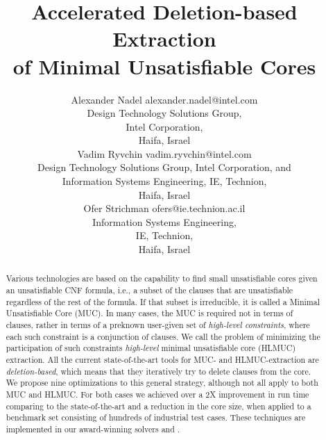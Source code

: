 \documentclass[twoside,11pt]{article}
\newcommand\haifamuc{\tool{HaifaMUC}\xspace}
\newcommand\haifahlmuc{\tool{HaifaHLMUC}\xspace}
\begin{document}


\newcommand\full[1]{}
\newcommand\short[1]{#1}
\title{Accelerated Deletion-based Extraction\\of Minimal Unsatisfiable Cores}
\author{\name Alexander Nadel
\email alexander.nadel@intel.com \\
\addr Design Technology Solutions Group, \\
Intel Corporation, \\
Haifa, Israel \\
%
\name Vadim Ryvchin
\email vadim.ryvchin@intel.com \\
\addr Design Technology Solutions Group, Intel Corporation, and\\
Information Systems Engineering, IE, Technion,\\
Haifa, Israel \\
%
\name Ofer Strichman
\email ofers@ie.technion.ac.il \\
\addr Information Systems Engineering, \\
IE, Technion, \\
Haifa, Israel \\
}

\maketitle

\begin{abstract}
Various technologies are based on the capability to find small unsatisfiable cores given an unsatisfiable CNF formula, i.e., a subset of the clauses that are unsatisfiable regardless of the rest of the formula.
If that subset is irreducible, it is called a Minimal Unsatisfiable Core (MUC).
In many cases, the MUC is required not in terms of clauses, rather in terms of a preknown user-given set of \emph{high-level constraints}, where each such constraint is a conjunction of clauses.
We call the problem of minimizing the participation of such
constraints \emph{high-level} minimal unsatisfiable
core (HLMUC) extraction. All the current state-of-the-art tools for MUC- and HLMUC-extraction are \emph{deletion-based}, which means that they iteratively try to delete clauses from the core.
We propose nine optimizations to this general strategy, although not all apply to
both MUC and HLMUC. For both cases we achieved over a 2X improvement in run
time comparing to the state-of-the-art and a reduction in the core size, when
applied to a benchmark set consisting of hundreds of industrial test cases.
These techniques are implemented in our award-winning solvers \haifamuc and
\haifahlmuc.
\end{abstract}
\end{document}
